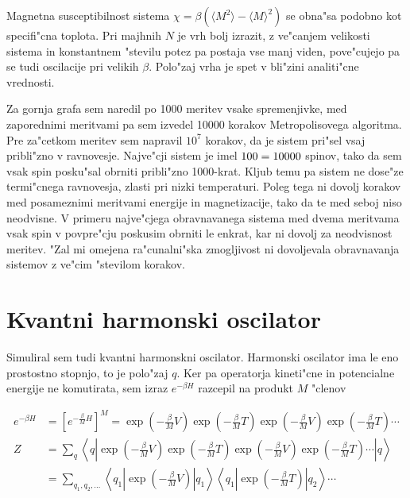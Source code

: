 \documentclass[a4paper,10pt]{article}
\begin{document}
\begin{figure}[H]
 \centering
 
\end{figure}

Magnetna susceptibilnost sistema $\chi = \beta(\langle M^2 \rangle - \langle M \rangle^2)$ se obna"sa podobno kot specifi"cna toplota. 
Pri majhnih $N$ je vrh bolj izrazit, z ve"canjem velikosti sistema in konstantnem "stevilu potez pa postaja vse manj viden, pove"cujejo pa se tudi oscilacije pri velikih $\beta$. 
Polo"zaj vrha je spet v bli"zini analiti"cne vrednosti. 

Za gornja grafa sem naredil po 1000 meritev vsake spremenjivke, med zaporednimi meritvami pa sem izvedel 10000 korakov Metropolisovega algoritma. 
Pre za"cetkom meritev sem napravil $10^7$ korakov, da je sistem pri"sel vsaj pribli"zno v ravnovesje. 
Najve"cji sistem je imel $100 \time 100 = 10000$ spinov, tako da sem vsak spin posku"sal obrniti pribli"zno 1000-krat. 
Kljub temu pa sistem ne dose"ze termi"cnega ravnovesja, zlasti pri nizki temperaturi. 
Poleg tega ni dovolj korakov med posameznimi meritvami energije in magnetizacije, tako da te med seboj niso neodvisne. 
V primeru najve"cjega obravnavanega sistema med dvema meritvama vsak spin v povpre"cju poskusim obrniti le enkrat, kar ni dovolj za neodvisnost meritev. 
"Zal mi omejena ra"cunalni"ska zmogljivost ni dovoljevala obravnavanja sistemov z ve"cim "stevilom korakov. 

\section{Kvantni harmonski oscilator}

Simuliral sem tudi kvantni harmonskni oscilator. 
Harmonski oscilator ima le eno prostostno stopnjo, to je polo"zaj $q$. 
Ker pa operatorja kineti"cne in potencialne energije ne komutirata, sem izraz $e^{-\beta H}$ razcepil na produkt $M$ "clenov

\begin{align}
 e^{-\beta H} &= \left[e^{-\frac{\beta}{M}H}\right]^M = \exp\left(-{\frac{\beta}{M}V}\right) \exp\left(-{\frac{\beta}{M}T}\right) \exp\left(-{\frac{\beta}{M}V}\right) \exp\left(-{\frac{\beta}{M}T}\right) \cdots \\
 Z &= \sum_{q} \left\langle q \left|\exp\left(-{\frac{\beta}{M}V}\right) \exp\left(-{\frac{\beta}{M}T}\right) \exp\left(-{\frac{\beta}{M}V}\right) \exp\left(-{\frac{\beta}{M}T}\right) \cdots \right| q \right\rangle \\
 &= \sum_{q_1, q_2, \ldots} \left\langle q_1 \left|\exp\left(-{\frac{\beta}{M}V}\right) \right|q_1\right\rangle \left\langle q_1 \left| \exp\left(-{\frac{\beta}{M}T}\right) \right|q_2\right\rangle \cdots
\end{align}
\end{document}

